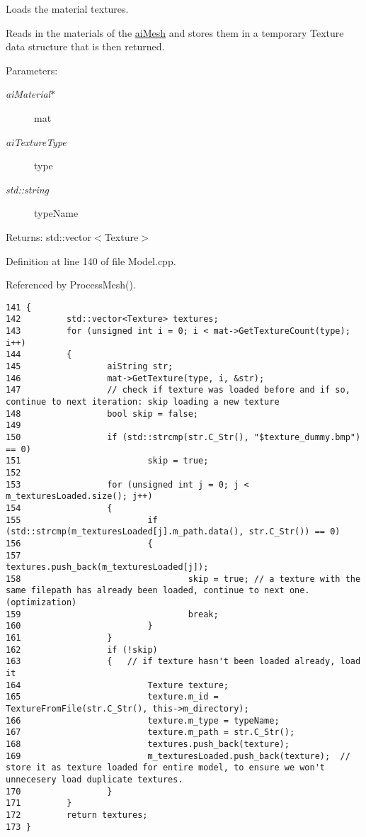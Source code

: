 Loads the material textures. 

Reads in the materials of the \hyperlink{structai_mesh}{aiMesh} and stores them in a temporary Texture data structure that is then returned.

\begin{Desc}
\item[Parameters:]
\begin{description}
\item[{\em aiMaterial$\ast$}]mat \item[{\em aiTextureType}]type \item[{\em std::string}]typeName \end{description}
\end{Desc}
\begin{Desc}
\item[Returns:]std::vector$<$Texture$>$ \end{Desc}


Definition at line 140 of file Model.cpp.

Referenced by ProcessMesh().

\begin{Code}\begin{verbatim}141 {
142         std::vector<Texture> textures;
143         for (unsigned int i = 0; i < mat->GetTextureCount(type); i++)
144         {
145                 aiString str;
146                 mat->GetTexture(type, i, &str);
147                 // check if texture was loaded before and if so, continue to next iteration: skip loading a new texture
148                 bool skip = false;
149 
150                 if (std::strcmp(str.C_Str(), "$texture_dummy.bmp") == 0)
151                         skip = true;
152 
153                 for (unsigned int j = 0; j < m_texturesLoaded.size(); j++)
154                 {
155                         if (std::strcmp(m_texturesLoaded[j].m_path.data(), str.C_Str()) == 0)
156                         {
157                                 textures.push_back(m_texturesLoaded[j]);
158                                 skip = true; // a texture with the same filepath has already been loaded, continue to next one. (optimization)
159                                 break;
160                         }
161                 }
162                 if (!skip)
163                 {   // if texture hasn't been loaded already, load it
164                         Texture texture;
165                         texture.m_id = TextureFromFile(str.C_Str(), this->m_directory);
166                         texture.m_type = typeName;
167                         texture.m_path = str.C_Str();
168                         textures.push_back(texture);
169                         m_texturesLoaded.push_back(texture);  // store it as texture loaded for entire model, to ensure we won't unnecesery load duplicate textures.
170                 }
171         }
172         return textures;
173 }
\end{verbatim}
\end{Code}




